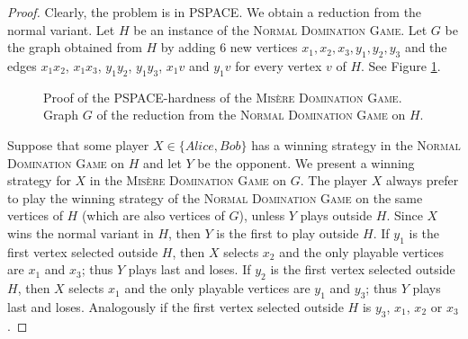 \documentclass[12pt]{article}
\begin{document}
\begin{proof}
Clearly, the problem is in PSPACE.
We obtain a reduction from the normal variant.
Let $H$ be an instance of the \textsc{Normal Domination Game}. Let $G$ be the graph obtained from $H$ by adding 6 new vertices $x_1,x_2,x_3,y_1,y_2,y_3$ and the edges $x_1x_2$, $x_1x_3$, $y_1y_2$, $y_1y_3$, $x_1v$ and $y_1v$ for every vertex $v$ of $H$. See Figure \ref{fig-dom-misere}.


\begin{figure}[ht]\centering
{}
\caption{\label{fig-dom-misere}Proof of the PSPACE-hardness of the \textsc{Misère Domination Game}. Graph $G$ of the reduction from the \textsc{Normal Domination Game} on $H$.}
\end{figure} 

Suppose that some player $X\in\{Alice, Bob\}$ has a winning strategy in the \textsc{Normal Domination Game} on $H$ and let $Y$ be the opponent. We present a winning strategy for $X$ in the \textsc{Misère Domination Game} on $G$. The player $X$ always prefer to play the winning strategy of the \textsc{Normal Domination Game} on the same vertices of $H$ (which are also vertices of $G$), unless $Y$ plays outside $H$. Since $X$ wins the normal variant in $H$, then $Y$ is the first to play outside $H$.
If $y_1$ is the first vertex selected outside $H$, then $X$ selects $x_2$ and the only playable vertices are $x_1$ and $x_3$; thus $Y$ plays last and loses.
If $y_2$ is the first vertex selected outside $H$, then $X$ selects $x_1$ and the only playable vertices are $y_1$ and $y_3$; thus $Y$ plays last and loses. Analogously if the first vertex selected outside $H$ is $y_3$, $x_1$, $x_2$ or $x_3$.
\end{proof}
\end{document}
